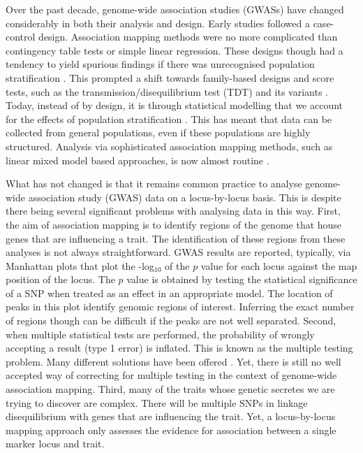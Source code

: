 \documentclass{article}
\begin{document}
Over the past decade,  genome-wide association studies (GWASs) have changed considerably in both their analysis and design. Early studies
 followed a case-control design. Association mapping methods were no more complicated than contingency table tests or simple 
linear regression. These designs though had a tendency to yield spurious findings if there was unrecognised population stratification 
\cite{cardon2003population}. This prompted a shift towards family-based designs and score tests, such as the transmission/disequilibrium test (TDT)  and its variants \cite{spielman1996tdt}. Today, instead of by design, it is through statistical modelling that we account for the effects of population stratification \cite{price2010new}. This has meant that data can be collected from general populations, even if these populations are highly structured. Analysis via sophisticated association mapping methods, such as linear mixed model based approaches,  is now almost routine \cite{purcell2007plink, bradbury2007tassel}.

What has not changed is that it remains common practice to analyse genome-wide association study (GWAS) data on a locus-by-locus basis. This is despite there being several significant problems with analysing data in this way. 
First, the aim of association mapping is to identify regions of the genome that house genes that are influencing a trait. 
The identification of these regions from these analyses is not always straightforward. GWAS results are reported, typically, via Manhattan plots 
that plot the -log$_{10}$ of the $p$ value for each locus against the map position of the locus. The $p$ value is obtained by testing the statistical 
significance of a SNP when treated as an effect in an appropriate model. 
The location of peaks in this plot identify genomic 
regions of interest. Inferring the exact number of regions though can be difficult if the peaks are not well separated. Second, when multiple statistical tests are performed, the probability of wrongly accepting a result (type 1 error) is inflated. This is known as the multiple testing problem. 
Many different solutions have been offered \cite{storey2003statistical, li2005adjusting, de2005efficiency}. Yet, there is still no well accepted way of correcting for multiple testing in the context of genome-wide association mapping. Third, many of the traits whose genetic secretes we are trying to discover are complex. There will be multiple SNPs in linkage disequilibrium with genes that are influencing the trait. Yet, a locus-by-locus mapping approach only assesses the evidence for association between a single marker locus and trait.
\end{document}
